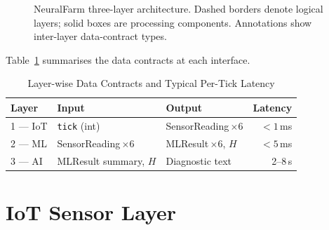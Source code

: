 \documentclass[journal,10pt,twocolumn]{IEEEtran}
\begin{document}
\begin{figure}[t]
\caption{NeuralFarm three-layer architecture. Dashed borders denote
logical layers; solid boxes are processing components. Annotations show
inter-layer data-contract types.}
\label{fig:arch}
\end{figure}

Table~\ref{tab:contracts} summarises the data contracts at each interface.

\begin{table}[t]
\caption{Layer-wise Data Contracts and Typical Per-Tick Latency}
\label{tab:contracts}
\centering
\footnotesize
\setlength\tabcolsep{4pt}
\begin{tabular}{p{9mm}p{16mm}p{18mm}r}
\toprule
\textbf{Layer} & \textbf{Input} & \textbf{Output} & \textbf{Latency}\\
\midrule
1 — IoT  & \texttt{tick} (int)
         & SensorReading\,$\times$6        & $<1$\,ms \\
2 — ML   & SensorReading\,$\times$6
         & MLResult\,$\times$6, $H$        & $<5$\,ms \\
3 — AI   & MLResult summary, $H$
         & Diagnostic text                 & 2--8\,s  \\
\bottomrule
\end{tabular}
\end{table}

\section{IoT Sensor Layer}
\label{sec:iot}
\end{document}
